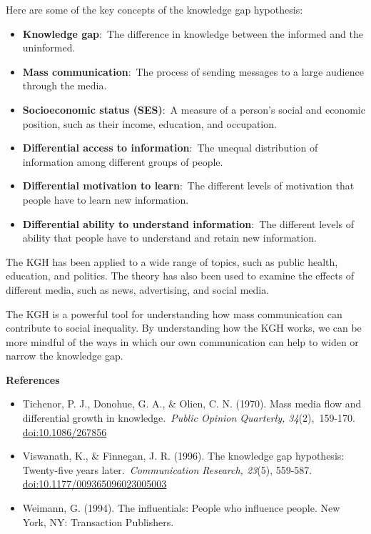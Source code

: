 \documentclass[
  b5paper]{book}
\begin{document}
Here are some of the key concepts of the knowledge gap hypothesis:

\begin{itemize}
\item
  \textbf{Knowledge gap}:~The difference in knowledge between the informed and the uninformed.
\item
  \textbf{Mass communication}:~The process of sending messages to a large audience through the media.
\item
  \textbf{Socioeconomic status (SES)}:~A measure of a person's social and economic position, such as their income, education, and occupation.
\item
  \textbf{Differential access to information}:~The unequal distribution of information among different groups of people.
\item
  \textbf{Differential motivation to learn}:~The different levels of motivation that people have to learn new information.
\item
  \textbf{Differential ability to understand information}:~The different levels of ability that people have to understand and retain new information.
\end{itemize}

The KGH has been applied to a wide range of topics, such as public health, education, and politics. The theory has also been used to examine the effects of different media, such as news, advertising, and social media.

The KGH is a powerful tool for understanding how mass communication can contribute to social inequality. By understanding how the KGH works, we can be more mindful of the ways in which our own communication can help to widen or narrow the knowledge gap.

\textbf{References}

\begin{itemize}
\item
  Tichenor, P. J., Donohue, G. A., \& Olien, C. N. (1970). Mass media flow and differential growth in knowledge.~\emph{Public Opinion Quarterly, 34}(2),~159-170. \url{doi:10.1086/267856}
\item
  Viswanath, K., \& Finnegan, J. R. (1996). The knowledge gap hypothesis: Twenty-five years later.~\emph{Communication Research, 23}(5), 559-587. \url{doi:10.1177/009365096023005003}
\item
  Weimann, G. (1994). The influentials: People who influence people. New York, NY: Transaction Publishers.
\end{itemize}
\end{document}
